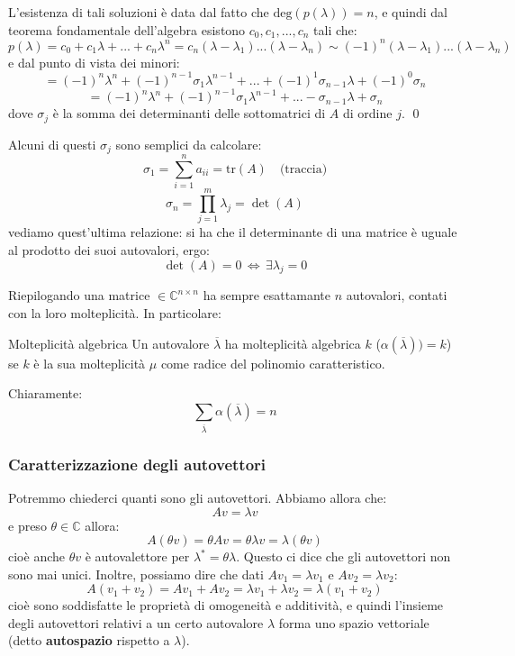 \documentclass[a4paper,11pt]{article}
\begin{document}
L'esistenza di tali soluzioni è data dal fatto che $\mathrm{deg}\left(p(\lambda)\right) = n$, e quindi dal teorema fondamentale dell'algebra esistono $c_0, c_1, ..., c_n$ tali che:
$$
p(\lambda) = c_0 + c_1 \lambda + ... + c_n \lambda^n = c_n (\lambda - \lambda_1) ... (\lambda - \lambda_n) \sim (-1)^n (\lambda - \lambda_1) ... (\lambda - \lambda_n)
$$
e dal punto di vista dei minori:
$$
= (-1)^n \lambda^n + (-1)^{n - 1} \sigma_1 \lambda^{n - 1} + ... + (-1)^1 \sigma_{n - 1} \lambda + (-1)^0 \sigma_{n}
$$
$$
= (-1)^n \lambda^n + (-1)^{n - 1} \sigma_1 \lambda^{n - 1} + ... - \sigma_{n - 1} \lambda + \sigma_{n}
$$
dove $\sigma_j$ è la somma dei determinanti delle sottomatrici di $A$ di ordine $j$. \qed

Alcuni di questi $\sigma_j$ sono semplici da calcolare:
$$
\sigma_1 = \sum_{i = 1}^n a_{ii} = \mathrm{tr}(A) \quad \text{(traccia)}
$$
$$
\sigma_n = \prod_{j=1}^m \lambda_j = \det(A)
$$
vediamo quest'ultima relazione: si ha che il determinante di una matrice è uguale al prodotto dei suoi autovalori, ergo:
$$
\det(A) = 0 \, \Leftrightarrow \, \exists \lambda_j = 0
$$

\par\smallskip

Riepilogando una matrice $\in \mathbb{C}^{n \times n}$ ha sempre esattamante $n$ autovalori, contati con la loro molteplicità.
In particolare:
\begin{definition}{Molteplicità algebrica}
	Un autovalore $\overline{\lambda}$ ha molteplicità algebrica $k$ ($\alpha(\overline{\lambda})) = k$) se $k$ è la sua molteplicità $\mu$ come radice del polinomio caratteristico.
\end{definition}

Chiaramente:
$$
\sum_{\overline{\lambda}} \alpha(\overline{\lambda}) = n
$$

\subsubsection{Caratterizzazione degli autovettori}
Potremmo chiederci quanti sono gli autovettori.
Abbiamo allora che:
$$
A v = \lambda v
$$
e preso $\theta \in \mathbb{C}$ allora:
$$
A(\theta v) = \theta A v
 = \theta \lambda v = \lambda (\theta v)
 $$
cioè anche $\theta v$ è autovalettore per $\lambda^* = \theta \lambda$.
Questo ci dice che gli autovettori non sono mai unici.
Inoltre, possiamo dire che dati $A v_1 = \lambda v_1$ e $A v_2 = \lambda v_2$:
$$
A(v_1 + v_2) = A v_1 + A v_2 = \lambda v_1 + \lambda v_2 = \lambda (v_1 + v_2)
$$
cioè sono soddisfatte le proprietà di omogeneità e additività, e quindi l'insieme degli autovettori relativi a un certo autovalore $\lambda$ forma uno spazio vettoriale (detto \textbf{autospazio} rispetto a $\lambda$).
\end{document}

